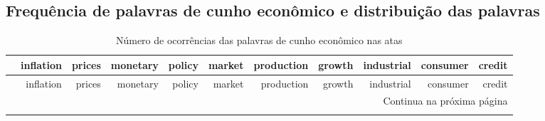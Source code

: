 \begin{landscape}
\chapter{Frequência de palavras de cunho econômico e distribuição das palavras} \label{anexoa}

\begin{longtable}{rrrrrrrrrrr}
\caption{Número de ocorrências das palavras de cunho econômico nas atas} \label{tab:long} \\
\hline
& inflation & prices & monetary & policy & market & production & growth & industrial & consumer & credit \\ \hline
\endfirsthead
 
\hline
& inflation & prices & monetary & policy & market & production & growth & industrial & consumer & credit \\ \hline
\endhead

\hline \multicolumn{11}{r}{{Continua na próxima página}} \\ \hline
\endfoot

\hline
\endlastfoot



\end{longtable}
\end{landscape}

